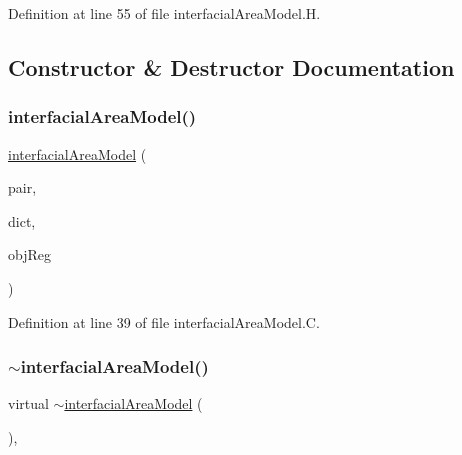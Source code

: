 Definition at line 55 of file interfacial\+Area\+Model.\+H.



\subsection{Constructor \& Destructor Documentation}
\mbox{\label{classFoam_1_1interfacialAreaModel_aef02e6183cd468742f7aafd0606aad3f}} 
\subsubsection{\texorpdfstring{interfacial\+Area\+Model()}{interfacialAreaModel()}}
{\footnotesize\ttfamily \hyperlink{classFoam_1_1interfacialAreaModel}{interfacial\+Area\+Model} (\begin{DoxyParamCaption}\item[{const \hyperlink{classFoam_1_1FFPair}{F\+F\+Pair} \&}]{pair,  }\item[{const dictionary \&}]{dict,  }\item[{const object\+Registry \&}]{obj\+Reg }\end{DoxyParamCaption})}



Definition at line 39 of file interfacial\+Area\+Model.\+C.

\mbox{\label{classFoam_1_1interfacialAreaModel_a02e40f3d07110ec4343cfc40dbe4c540}} 
\subsubsection{\texorpdfstring{$\sim$interfacial\+Area\+Model()}{~interfacialAreaModel()}}
{\footnotesize\ttfamily virtual $\sim$\hyperlink{classFoam_1_1interfacialAreaModel}{interfacial\+Area\+Model} (\begin{DoxyParamCaption}{ }\end{DoxyParamCaption})\hspace{0.3cm}{\ttfamily [inline]}, {\ttfamily [virtual]}}



